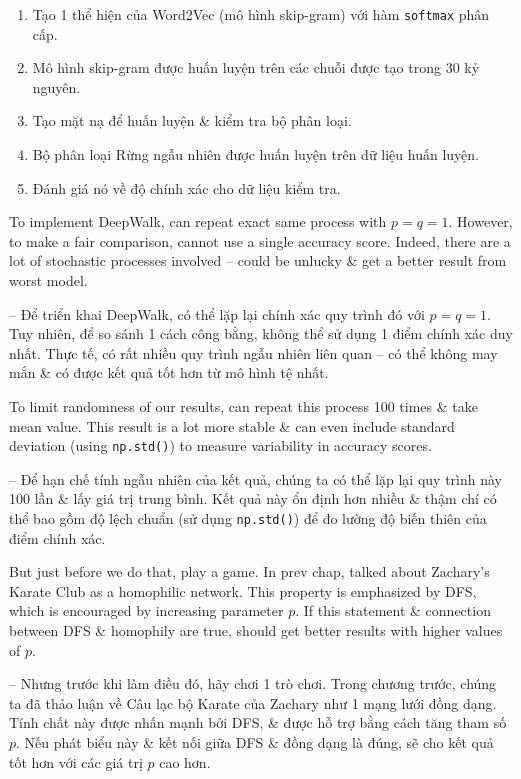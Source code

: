 \documentclass{article}
\begin{document}
\begin{itemize}
\begin{itemize}
\begin{enumerate}
            \item Tạo 1 thể hiện của Word2Vec (mô hình skip-gram) với hàm {\tt softmax} phân cấp.
            \item Mô hình skip-gram được huấn luyện trên các chuỗi được tạo trong 30 kỷ nguyên.
            \item Tạo mặt nạ để huấn luyện \& kiểm tra bộ phân loại.
            \item Bộ phân loại Rừng ngẫu nhiên được huấn luyện trên dữ liệu huấn luyện.
            \item Đánh giá nó về độ chính xác cho dữ liệu kiểm tra.
        \end{enumerate}
        To implement DeepWalk, can repeat exact same process with $p = q = 1$. However, to make a fair comparison, cannot use a single accuracy score. Indeed, there are a lot of stochastic processes involved -- could be unlucky \& get a better result from worst model.

        -- Để triển khai DeepWalk, có thể lặp lại chính xác quy trình đó với $p = q = 1$. Tuy nhiên, để so sánh 1 cách công bằng, không thể sử dụng 1 điểm chính xác duy nhất. Thực tế, có rất nhiều quy trình ngẫu nhiên liên quan -- có thể không may mắn \& có được kết quả tốt hơn từ mô hình tệ nhất.

        To limit randomness of our results, can repeat this process 100 times \& take mean value. This result is a lot more stable \& can even include standard deviation (using {\tt np.std()}) to measure variability in accuracy scores.

        -- Để hạn chế tính ngẫu nhiên của kết quả, chúng ta có thể lặp lại quy trình này 100 lần \& lấy giá trị trung bình. Kết quả này ổn định hơn nhiều \& thậm chí có thể bao gồm độ lệch chuẩn (sử dụng {\tt np.std()}) để đo lường độ biến thiên của điểm chính xác.

        But just before we do that, play a game. In prev chap, talked about Zachary's Karate Club as a homophilic network. This property is emphasized by DFS, which is encouraged by increasing parameter $p$. If this statement \& connection between DFS \& homophily are true, should get better results with higher values of $p$.

        -- Nhưng trước khi làm điều đó, hãy chơi 1 trò chơi. Trong chương trước, chúng ta đã thảo luận về Câu lạc bộ Karate của Zachary như 1 mạng lưới đồng dạng. Tính chất này được nhấn mạnh bởi DFS, \& được hỗ trợ bằng cách tăng tham số $p$. Nếu phát biểu này \& kết nối giữa DFS \& đồng dạng là đúng, sẽ cho kết quả tốt hơn với các giá trị $p$ cao hơn.


\end{itemize}
\end{itemize}
\end{document}
